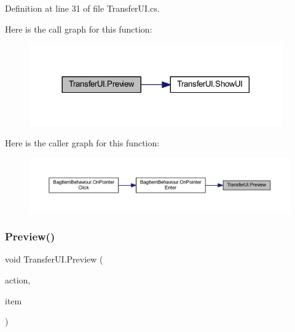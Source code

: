 Definition at line 31 of file Transfer\+U\+I.\+cs.

Here is the call graph for this function\+:
\nopagebreak
\begin{figure}[H]
\begin{center}
\leavevmode
\includegraphics[width=308pt]{class_transfer_u_i_a9d2e7c3708193e3d51fe8539f9c41a75_cgraph}
\end{center}
\end{figure}
Here is the caller graph for this function\+:
\nopagebreak
\begin{figure}[H]
\begin{center}
\leavevmode
\includegraphics[width=350pt]{class_transfer_u_i_a9d2e7c3708193e3d51fe8539f9c41a75_icgraph}
\end{center}
\end{figure}
\mbox{\label{class_transfer_u_i_a52bd586cae27d6570e207d856457a116}} 
\subsubsection{\texorpdfstring{Preview()}{Preview()}\hspace{0.1cm}{\footnotesize\ttfamily [2/2]}}
{\footnotesize\ttfamily void Transfer\+U\+I.\+Preview (\begin{DoxyParamCaption}\item[{\mbox{\hyperlink{class_container_behaviour_a8ad6b6c9b34c2e0abdaaf0627f87b036}{Container\+Behaviour.\+Actions}}}]{action,  }\item[{\mbox{\hyperlink{class_base_item}{Base\+Item}}}]{item }\end{DoxyParamCaption})}



